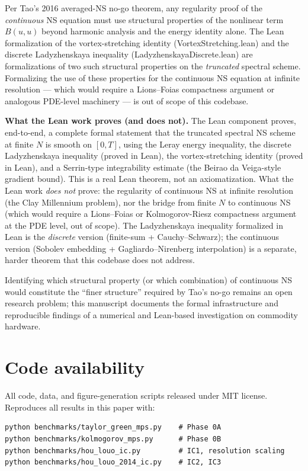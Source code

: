 \documentclass[11pt]{article}
\begin{document}
Per Tao's 2016 averaged-NS no-go theorem, any regularity proof of the
\emph{continuous} NS equation must use structural properties of the
nonlinear term $B(u, u)$ beyond harmonic analysis and the energy
identity alone. The Lean formalization of the vortex-stretching
identity (VortexStretching.lean) and the discrete Ladyzhenskaya
inequality (LadyzhenskayaDiscrete.lean) are formalizations of two
such structural properties on the \emph{truncated} spectral scheme.
Formalizing the use of these properties for the continuous NS equation
at infinite resolution --- which would require a Lions--Foias
compactness argument or analogous PDE-level machinery --- is out of
scope of this codebase.

\textbf{What the Lean work proves (and does not).} The Lean component
proves, end-to-end, a complete formal statement that the truncated
spectral NS scheme at finite $N$ is smooth on $[0, T]$, using the
Leray energy inequality, the discrete Ladyzhenskaya inequality (proved
in Lean), the vortex-stretching identity (proved in Lean), and a
Serrin-type integrability estimate (the Beirao da Veiga-style gradient
bound). This is a real Lean theorem, not an axiomatization. What the
Lean work \emph{does not} prove: the regularity of continuous NS at
infinite resolution (the Clay Millennium problem), nor the bridge
from finite $N$ to continuous NS (which would require a Lions--Foias
or Kolmogorov-Riesz compactness argument at the PDE level, out of
scope). The Ladyzhenskaya inequality formalized in Lean is the
\emph{discrete} version (finite-sum + Cauchy--Schwarz); the continuous
version (Sobolev embedding + Gagliardo--Nirenberg interpolation) is a
separate, harder theorem that this codebase does not address.

Identifying which structural property (or which combination) of
continuous NS would constitute the ``finer structure'' required by
Tao's no-go remains an open research problem; this manuscript
documents the formal infrastructure and reproducible findings of a
numerical and Lean-based investigation on commodity hardware.


\section{Code availability}

All code, data, and figure-generation scripts released under MIT
license. Reproduces all results in this paper with:

\begin{verbatim}
python benchmarks/taylor_green_mps.py    # Phase 0A
python benchmarks/kolmogorov_mps.py      # Phase 0B
python benchmarks/hou_louo_ic.py         # IC1, resolution scaling
python benchmarks/hou_louo_2014_ic.py    # IC2, IC3
\end{verbatim}
\end{document}
